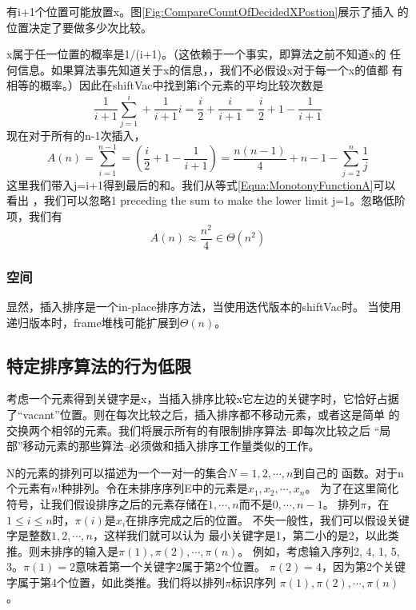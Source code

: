 有i+1个位置可能放置x。图\ref{Fig:CompareCountOfDecidedXPostion}展示了插入
的位置决定了要做多少次比较。

x属于任一位置的概率是1/(i+1)。（这依赖于一个事实，即算法之前不知道x的
任何信息。如果算法事先知道关于x的信息，，我们不必假设x对于每一个x的值都
有相等的概率。）因此在shiftVac中找到第i个元素的平均比较次数是
\begin{displaymath}
\frac{1}{i+1}\sum_{j=1}^i+\frac{1}{i+1}i=\frac{i}{2}+\frac{i}{i+1}=\frac{i}{2}+1-\frac{1}{i+1}
\end{displaymath}
现在对于所有的n-1次插入，
\begin{displaymath}
A(n)=\sum_{i=1}^{n-1}=(\frac{i}{2}+1-\frac{1}{i+1})=\frac{n(n-1)}{4}+n-1-\sum_{j=2}^n\frac{1}{j}
\end{displaymath}
这里我们带入j=i+1得到最后的和。我们从等式\ref{Equa:MonotonyFunctionA}可以
看出 ，我们可以忽略1 preceding the sum to make the lower limit j=1。忽略低阶项，我们有
\begin{displaymath}
A(n)\approx \frac{n^2}{4}\in \Theta(n^2)
\end{displaymath}

\subsubsection{空间}
显然，插入排序是一个in-place排序方法，当使用迭代版本的shiftVac时。
当使用递归版本时，frame堆栈可能扩展到$\Theta(n)$。

\subsection{特定排序算法的行为低限}
考虑一个元素得到关键字是x，当插入排序比较x它左边的关键字时，它恰好占据
了“vacant”位置。则在每次比较之后，插入排序都不移动元素，或者这是简单
的交换两个相邻的元素。我们将展示所有的有限制排序算法--即每次比较之后
“局部”移动元素的那些算法--必须做和插入排序工作量类似的工作。

N的元素的排列可以描述为一个一对一的集合$N={1, 2, \cdots, n}$到自己的
函数。对于n个元素有$n!$种排列。令在未排序序列E中的元素是$x_1, x_2, \cdots, x_n$。
为了在这里简化符号，让我们假设排序之后的元素存储在$1, \cdots, n$而不是$0, \cdots, n-1$。
排列$\pi$，在$1\leq i\leq n$时，$\pi(i)$是$x_i$在排序完成之后的位置。
不失一般性，我们可以假设关键字是整数$1, 2, \cdots, n$，这样我们就可以认为
最小关键字是1，第二小的是2，以此类推。则未排序的输入是$\pi(1), \pi(2), \cdots, \pi(n)$。
例如，考虑输入序列2, 4, 1, 5, 3。$\pi(1)=2$意味着第一个关键字2属于第2个位置。
$\pi(2)=4$，因为第2个关键字属于第4个位置，如此类推。我们将以排列$\pi$标识序列
$\pi(1), \pi(2), \cdots, \pi(n)$。

